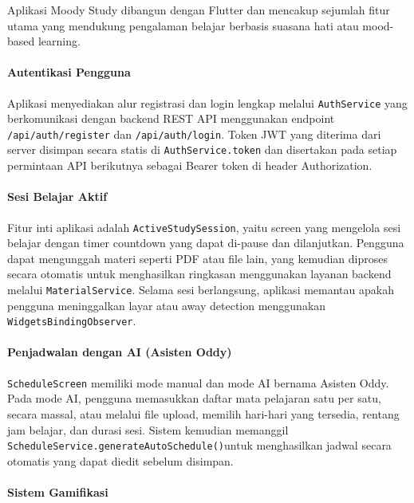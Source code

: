 \documentclass[11pt]{article}
\begin{document}
Aplikasi Moody Study dibangun dengan Flutter dan mencakup sejumlah fitur utama yang mendukung pengalaman belajar berbasis suasana hati atau mood-based learning.

\paragraph{Autentikasi Pengguna}

Aplikasi menyediakan alur registrasi dan login lengkap melalui \texttt{AuthService} yang berkomunikasi dengan backend REST API menggunakan endpoint \texttt{/api/auth/register} dan \texttt{/api/auth/login}. Token JWT yang diterima dari server disimpan secara statis di \texttt{AuthService.token} dan disertakan pada setiap permintaan API berikutnya sebagai Bearer token di header Authorization.

\paragraph{Sesi Belajar Aktif}

Fitur inti aplikasi adalah \texttt{ActiveStudySession}, yaitu screen yang mengelola sesi belajar dengan timer countdown yang dapat di-pause dan dilanjutkan. Pengguna dapat mengunggah materi seperti PDF atau file lain, yang kemudian diproses secara otomatis untuk menghasilkan ringkasan menggunakan layanan backend melalui \texttt{MaterialService}. Selama sesi berlangsung, aplikasi memantau apakah pengguna meninggalkan layar atau away detection menggunakan \texttt{WidgetsBindingObserver}\linebreak[1].

\paragraph{Penjadwalan dengan AI (Asisten Oddy)}

\texttt{ScheduleScreen} memiliki mode manual dan mode AI bernama Asisten Oddy. Pada mode AI, pengguna memasukkan daftar mata pelajaran satu per satu, secara massal, atau melalui file upload, memilih hari-hari yang tersedia, rentang jam belajar, dan durasi sesi. Sistem kemudian memanggil \texttt{ScheduleService.generateAutoSchedule()}\linebreak[1] untuk menghasilkan jadwal secara otomatis yang dapat diedit sebelum disimpan.

\paragraph{Sistem Gamifikasi}
\end{document}
